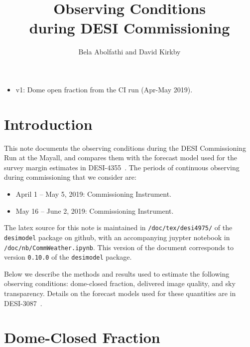 \documentclass[12pt]{article}
\title{Observing Conditions\\
during DESI Commissioning\\
\vspace{5mm}{\large\bf DESI-doc-4975-v1}}
\author{Bela Abolfathi and David Kirkby}
\begin{document}
\maketitle

\begin{itemize}
    \item v1: Dome open fraction from the CI run (Apr-May 2019).
\end{itemize}

\section{Introduction}

This note documents the observing conditions during the DESI Commissioning Run at the Mayall, and compares them
with the forecast model used for the survey margin estimates in DESI-4355~\cite{desi-4355}.
The periods of continuous observing during commissioning that we consider are:
\begin{itemize}
\item April 1 -- May 5, 2019: Commissioning Instrument.
\item May 16 -- June 2, 2019: Commissioning Instrument.
\end{itemize}

The latex source for this note is maintained in {\tt /doc/tex/desi4975/} of the {\tt desimodel} package on github,
with an accompanying juypter notebook in {\tt /doc/nb/CommWeather.ipynb}. This version of the document corresponds to
version {\tt 0.10.0} of the {\tt desimodel} package.

Below we describe the methods and results used to estimate the following observing conditions: dome-closed fraction,
delivered image quality, and sky transparency.  Details on the forecast models used for these quantities are in
DESI-3087~\cite{desi-3087}.

\section{Dome-Closed Fraction}
\end{document}
